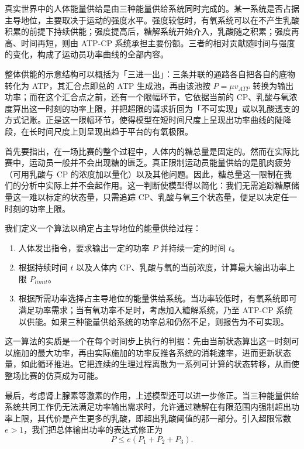\documentclass[11pt,a4paper]{ctexart}
\begin{document}
真实世界中的人体能量供给是由三种能量供给系统同时完成的。某一系统是否占据主导地位，主要取决于运动的强度水平。强度较低时，有氧系统可以在不产生乳酸积累的前提下持续供能；强度提高后，糖解系统开始介入，乳酸随之积累；强度再高、时间再短，则由 ATP-CP 系统承担主要份额。三者的相对贡献随时间与强度的变化，构成了运动员功率曲线的全部内容。

整体供能的示意结构可以概括为「三进一出」：三条并联的通路各自把各自的底物转化为 ATP，其汇合点即总的 ATP 生成池，再由该池按 $P=\mu v_{ATP}$ 转换为输出功率；而在这个汇合点之前，还有一个限幅环节，它依据当前的 CP、乳酸与氧浓度算出这一时刻的功率上限，并把超限的请求折回为「不可实现」或以乳酸透支的方式记账。正是这一限幅环节，使得模型在短时间尺度上呈现出功率曲线的陡降段，在长时间尺度上则呈现出趋于平台的有氧极限。

首先要指出，在一场比赛的整个过程中，人体内的糖总量是固定的。然而在实际比赛中，运动员一般并不会出现糖的匮乏。真正限制运动员能量供给的是肌肉疲劳（可用乳酸与 CP 的浓度加以量化）以及其他问题。因此，糖总量这一限制在我们的分析中实际上并不会起作用。这一判断使模型得以简化：我们无需追踪糖原储量这一难以标定的状态量，只需追踪 CP、乳酸与氧三个状态量，便足以决定任一时刻的功率上限。

我们定义一个算法以确定占主导地位的能量供给过程：

\begin{enumerate}
\item 人体发出指令，要求输出一定的功率 $P$ 并持续一定的时间 $t$。
\item 根据持续时间 $t$ 以及人体内 CP、乳酸与氧的当前浓度，计算最大输出功率上限 $P_{limit}$。
\item 根据所需功率选择占主导地位的能量供给系统。当功率较低时，有氧系统即可满足功率需求；当有氧功率不足时，考虑加入糖解系统，乃至 ATP-CP 系统以供能。如果三种能量供给系统的功率总和仍然不足，则报告为不可实现。
\end{enumerate}

这一算法的实质是一个在每个时间步上执行的判据：先由当前状态算出这一时刻可以施加的最大功率，再由实际施加的功率反推各系统的消耗速率，进而更新状态量，如此循环推进。它把连续的生理过程离散为一系列可计算的状态转移，从而使整场比赛的仿真成为可能。

最后，考虑肾上腺素等激素的作用，上述模型还可以进一步修正。当三种能量供给系统共同工作仍无法满足功率输出需求时，允许通过糖解在有限范围内强制超出功率上限，其代价是产生更多的乳酸，即超出乳酸阈值的那一部分。引入超限常数 $e>1$，我们把总体输出功率的表达式修正为
\begin{equation}
P\leqslant e\left(P_1+P_2+P_3\right).
\end{equation}
\end{document}
